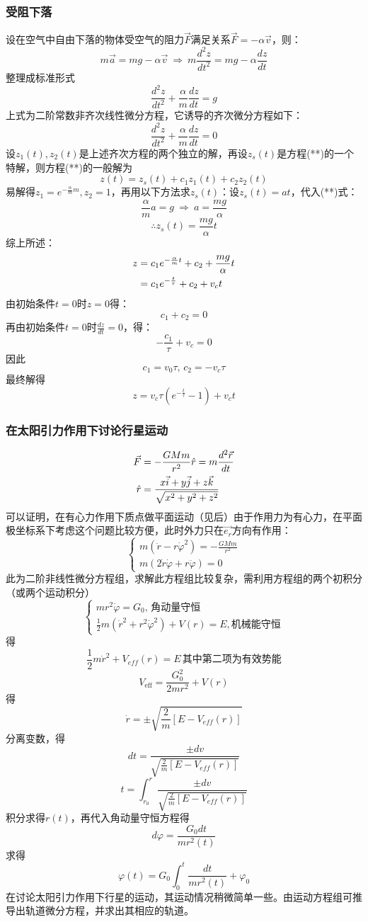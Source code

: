 \subsubsection{受阻下落}
设在空气中自由下落的物体受空气的阻力$\vec{F}$满足关系$\vec{F}=-\alpha\vec{v}$，则：
\[m\vec{a}=mg-\alpha\vec{v}\ \Rightarrow \ m\frac{d^2z}{dt^2}=mg-\alpha\frac{dz}{dt}\]
整理成标准形式
\[\frac{d^2z}{dt^2}+\frac{\alpha}{m}\frac{dz}{dt}=g\tag{**}\]
上式为二阶常数非齐次线性微分方程，它诱导的齐次微分方程如下：
\[\frac{d^2z}{dt^2}+\frac{\alpha}{m}\frac{dz}{dt}=0\]
设$z_1(t),z_2(t)$是上述齐次方程的两个独立的解，再设$z_s(t)$是方程(**)的一个特解，则方程(**)的一般解为
\[z(t)=z_s(t)+c_1z_1(t)+c_2z_2(t)\]
易解得$z_1=e^{-\frac{\alpha}{m}m},z_2=1$，再用以下方法求$z_s(t)$：设$z_s(t)=at$，代入(**)式：
\[\frac{\alpha}{m}a=g \ \Rightarrow\ a=\frac{mg}{\alpha}\]
\[\therefore z_s(t)=\frac{mg}{\alpha}t\]
综上所述：
\begin{align}
z&=c_1e^{-\frac{\alpha}{m}t}+c_2+\frac{mg}{\alpha}t \notag \\
&=c_1e^{-\frac{t}{\tau}}+c_2+v_ct\notag
\end{align}
由初始条件$t=0$时$z=0$得：
\[c_1+c_2=0\]
再由初始条件$t=0$时$\frac{dz}{dt}=0$，得：
\[-\frac{c_1}{\tau}+v_c=0\]
因此
\[c_1=v_0\tau,\,c_2=-v_c\tau\]
最终解得
\[z=v_c\tau\left(e^{-\frac{t}{\tau}}-1\right)+v_ct\]
\subsubsection{在太阳引力作用下讨论行星运动}
\begin{align}
\vec{F}&=-\frac{GMm}{r^2}\hat{r}=m\frac{d^2\vec{r}}{dt} \notag \\
\hat{r} &= \frac{x\vec{i}+y\vec{j}+z\vec{k}}{\sqrt{x^2+y^2+z^2}} \notag
\end{align}
可以证明，在有心力作用下质点做平面运动（见后）由于作用力为有心力，在平面极坐标系下考虑这个问题比较方便，此时外力只在$\vec{e_r}$方向有作用：
\[\begin{cases}
m(\ddot{r}-r\dot{\varphi}^2)=-\frac{GMm}{r^2}\\
m(2\dot{r}\dot{\varphi}+r\ddot{\varphi})=0
\end{cases}
\]
此为二阶非线性微分方程组，求解此方程组比较复杂，需利用方程组的两个初积分（或两个运动积分）
\[\begin{cases}
mr^2\dot{\varphi}=G_0,\,\text{角动量守恒}\\
\frac{1}{2}m(\dot{r}^2+r^2\dot{\varphi}^2)+V(r)=E,\text{机械能守恒}
\end{cases}
\]
得
\[
\frac{1}{2}m\dot{r}^2+V_{eff}(r)=E\,\text{其中第二项为有效势能}
\]
\[V_\text{eff}=\frac{G_0^2}{2mr^2}+V(r)\]
得
\[\dot{r}=\pm \sqrt{\frac{2}{m}[E-V_{eff}(r)]}\]
分离变数，得
\[dt=\frac{\pm dv}{\sqrt{\frac{2}{m}[E-V_{eff}(r)]}}\]
\[t=\int_{r_0}^r \frac{\pm dv}{\sqrt{\frac{2}{m}[E-V_{eff}(r)]}}\]
积分求得$r(t)$，再代入角动量守恒方程得
\[d\varphi = \frac{G_0 dt}{mr^2(t)}\]
求得
\[\varphi(t)=G_0\int_0^t \frac{dt}{mr^2(t)}+\varphi_0\]
在讨论太阳引力作用下行星的运动，其运动情况稍微简单一些。由运动方程组可推导出轨道微分方程，并求出其相应的轨道。

